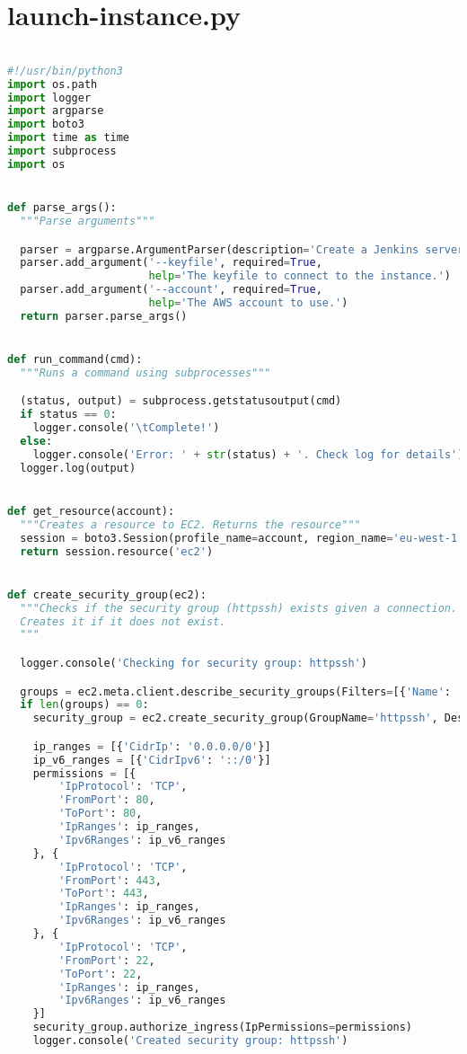 \section{launch-instance.py} \label{launch-instance}
\begin{lstlisting}[language=python]

#!/usr/bin/python3
import os.path
import logger
import argparse
import boto3
import time as time
import subprocess
import os


def parse_args():
  """Parse arguments"""

  parser = argparse.ArgumentParser(description='Create a Jenkins server on AWS')
  parser.add_argument('--keyfile', required=True,
                      help='The keyfile to connect to the instance.')
  parser.add_argument('--account', required=True,
                      help='The AWS account to use.')
  return parser.parse_args()


def run_command(cmd):
  """Runs a command using subprocesses"""

  (status, output) = subprocess.getstatusoutput(cmd)
  if status == 0:
    logger.console('\tComplete!')
  else:
    logger.console('Error: ' + str(status) + '. Check log for details')
  logger.log(output)


def get_resource(account):
  """Creates a resource to EC2. Returns the resource"""
  session = boto3.Session(profile_name=account, region_name='eu-west-1')
  return session.resource('ec2')


def create_security_group(ec2):
  """Checks if the security group (httpssh) exists given a connection.
  Creates it if it does not exist.
  """

  logger.console('Checking for security group: httpssh')

  groups = ec2.meta.client.describe_security_groups(Filters=[{'Name': 'group-name', 'Values': ['httpssh']}])['SecurityGroups']
  if len(groups) == 0:
    security_group = ec2.create_security_group(GroupName='httpssh', Description='Only HTTP and SSH')

    ip_ranges = [{'CidrIp': '0.0.0.0/0'}]
    ip_v6_ranges = [{'CidrIpv6': '::/0'}]
    permissions = [{
        'IpProtocol': 'TCP',
        'FromPort': 80,
        'ToPort': 80,
        'IpRanges': ip_ranges,
        'Ipv6Ranges': ip_v6_ranges
    }, {
        'IpProtocol': 'TCP',
        'FromPort': 443,
        'ToPort': 443,
        'IpRanges': ip_ranges,
        'Ipv6Ranges': ip_v6_ranges
    }, {
        'IpProtocol': 'TCP',
        'FromPort': 22,
        'ToPort': 22,
        'IpRanges': ip_ranges,
        'Ipv6Ranges': ip_v6_ranges
    }]
    security_group.authorize_ingress(IpPermissions=permissions)
    logger.console('Created security group: httpssh')


\end{lstlisting}
